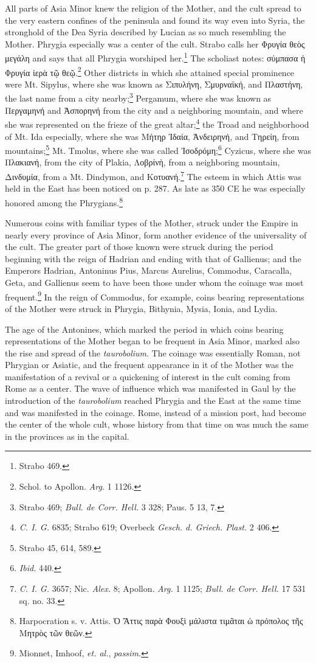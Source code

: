 \documentclass[a4paper, 11pt, oneside, polutonikogreek, french]{article}
\begin{document}
All parts of Asia Minor knew the religion of the Mother, and the cult spread to the very eastern confines of the peninsula and found its way even into Syria, the stronghold of the Dea Syria described by Lucian as so much resembling the Mother. Phrygia especially was a center of the cult. Strabo calls her Φρυγία θεὸς μεγάλη and says that all Phrygia worshiped her.\footnote{Strabo 469.} The scholiast notes: σύμπασα ἡ Φρυγία ἱερὰ τῷ θεῷ.\footnote{Schol. to Apollon. \emph{Arg.} 1 1126.} Other districts in which she attained special prominence were Mt. Sipylus, where she was known as Σιπυλήνη, Σμυρναϊκή, and Πλαστήνη, the last name from a city nearby;\footnote{Strabo 469; \emph{Bull. de Corr. Hell.} 3 328; Paus. 5 13, 7.} Pergamum, where she was known as Περγαμηνή and Ἀσπορηνή from the city and a neighboring mountain, and where she was represented on the frieze of the great altar;\footnote{\emph{C. I. G.} 6835; Strabo 619; Overbeck \emph{Gesch. d. Griech. Plast.} 2 406.} the Troad and neighborhood of Mt. Ida especially, where she was Μήτηρ Ἰδαία, Ἀνδειρηνή, and Τηρείη, from mountains;\footnote{Strabo 45, 614, 589.} Mt. Tmolus, where she was called Ἰσοδρόμη;\footnote{\emph{Ibid.} 440.} Cyzicus, where she was Πλακιανή, from the city of Plakia, Λοβρίνὴ, from a neighboring mountain, Δινδυμία, from a Mt. Dindymon, and Κοτυανή.\footnote{\emph{C. I. G.} 3657; Nic. \emph{Alex.} 8; Apollon. \emph{Arg.} 1 1125; \emph{Bull. de Corr. Hell.} 17 531 sq. no. 33.} The esteem in which Attis was held in the East has been noticed on p. 287. As late as 350 \textsc{CE} he was especially honored among the Phrygians.\footnote{Harpocration s. v. Attis. Ὁ Ἄττις παρὰ Φουξὶ μάλιστα τιμᾶται ὡ πρόπολος τῆς Μητρὸς τῶν θεῶν.}

Numerous coins with familiar types of the Mother, struck under the Empire in nearly every province of Asia Minor, form another evidence of the universality of the cult. The greater part of those known were struck during the period beginning with the reign of Hadrian and ending with that of Gallienus; and the Emperors Hadrian, Antoninus Pius, Marcus Aurelius, Commodus, Caracalla, Geta, and Gallienus seem to have been those under whom the coinage was most frequent.\footnote{Mionnet, Imhoof, \emph{et. al.}, \emph{passim.}} In the reign of Commodus, for example, coins bearing representations of the Mother were struck in Phrygia, Bithynia, Mysia, Ionia, and Lydia.

The age of the Antonines, which marked the period in which coins bearing representations of the Mother began to be frequent in Asia Minor, marked also the rise and spread of the \emph{taurobolium}. The coinage was essentially Roman, not Phrygian or Asiatic, and the frequent appearance in it of the Mother was the manifestation of a revival or a quickening of interest in the cult coming from Rome as a center. The wave of influence which was manifested in Gaul by the introduction of the \emph{taurobolium} reached Phrygia and the East at the same time and was manifested in the coinage. Rome, instead of a mission post, had become the center of the whole cult, whose history from that time on was much the same in the provinces as in the capital.
\end{document}
